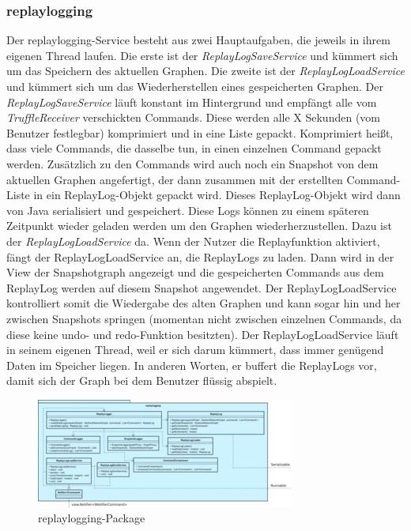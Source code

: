     \subsubsection{replaylogging}
    \label{subsubsec:replaylogging}

    Der replaylogging-Service besteht aus zwei Hauptaufgaben, die jeweils in ihrem eigenen Thread laufen.
    Die erste ist der \textit{ReplayLogSaveService} und kümmert sich um das Speichern des aktuellen
    Graphen. Die zweite ist der \textit{ReplayLogLoadService} und kümmert sich um das
    Wiederherstellen eines gespeicherten Graphen.
    \newline
    \newline
    Der \textit{ReplayLogSaveService} läuft konstant im Hintergrund und empfängt alle
    vom \textit{TruffleReceiver} verschickten Commands. Diese werden alle X
    Sekunden (vom Benutzer festlegbar) komprimiert und in eine Liste gepackt.
    Komprimiert heißt, dass viele Commands, die dasselbe tun, in einen einzelnen Command
    gepackt werden. Zusätzlich zu den Commands wird auch noch ein Snapshot
    von dem aktuellen Graphen angefertigt, der dann zusammen mit der erstellten
    Command-Liste in ein ReplayLog-Objekt gepackt wird. Dieses
    ReplayLog-Objekt wird dann von Java serialisiert und gespeichert.
    \newline
    \newline
    Diese Logs können zu einem späteren Zeitpunkt wieder geladen werden um den
    Graphen wiederherzustellen. Dazu ist der \textit{ReplayLogLoadService} da. Wenn
    der Nutzer die Replayfunktion aktiviert, fängt der ReplayLogLoadService an, die
    ReplayLogs zu laden. Dann wird in der View der Snapshotgraph angezeigt
    und die gespeicherten Commands aus dem ReplayLog werden auf
    diesem Snapshot angewendet. Der ReplayLogLoadService kontrolliert somit die
    Wiedergabe des alten Graphen und kann sogar hin und her zwischen Snapshots
    springen (momentan nicht zwischen einzelnen Commands, da diese keine undo-
    und redo-Funktion besitzten).
    \newline
    \newline
    Der ReplayLogLoadService läuft in seinem eigenen Thread, weil er sich darum
    kümmert, dass immer genügend Daten im Speicher liegen. In anderen Worten, er
    buffert die ReplayLogs vor, damit sich der Graph bei dem Benutzer flüssig
    abspielt.

    \clearpage
    \begin{figure}
      \centering
      \includegraphics[width=\textwidth]{../diagramimages/replaylogging.png}
      \caption{replaylogging-Package}
    \end{figure}
    \clearpage

